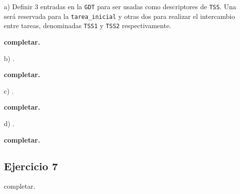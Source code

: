 \noindent
a) Definir 3 entradas en la \verb|GDT| para ser usadas como descriptores de \verb|TSS|. Una ser\'a reservada 
para la \verb|tarea_inicial| y otras dos para realizar el intercambio entre tareas, denominadas \verb|TSS1| 
y \verb|TSS2| respectivamente.

\vspace*{0.3cm}

\textbf{completar.}

\vspace*{0.5cm} \noindent



\noindent
b) .

\vspace*{0.3cm}

\textbf{completar.}

\vspace*{0.5cm} \noindent



\noindent
c) .

\vspace*{0.3cm}

\textbf{completar.}

\vspace*{0.5cm} \noindent



\noindent
d) .

\vspace*{0.3cm}

\textbf{completar.}

\vspace*{0.5cm} \noindent





\subsection*{Ejercicio 7}

\vspace*{0.3cm} \noindent

completar.

\newpage
